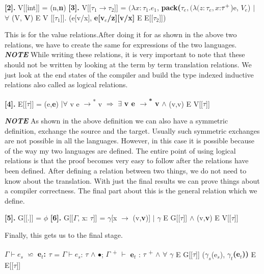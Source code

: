 \documentclass[10pt]{article}
\begin{document}
 \textbf{[2]. }V[[int]] = {(n,\textbf{n})}
 \vskip 0.1in
 \textbf{[3]. }V[[$\tau_1 \rightarrow \tau_2$]] = { $(\lambda x: \tau_1. e_1$, \textbf{pack($\tau_e, (\lambda(z:\tau_e,x$}:$\tau \textsuperscript{+}$)e, $V_e$) } $\lvert$ $\forall$ (V, \textbf{V})
E V [[$\tau_1$]]. (e[v/x], \textbf{e[v$_e$/z][v/x]} E E[[$\tau_2$]])
 
  
  \vskip 0.1in
  This is for the value relations.After doing it for as shown in the above two relations, we have to create the same for expressions of the two languages.  
  \vskip 0.2in
  \textbf{\textit{NOTE}} While writing these relations, it is very important to note that these should not be written by looking at the term by term translation relations. We just look at the end states of the compiler and build the type indexed inductive relations also called as logical relations. 
  
  \vskip 0.2in
  
  \textbf{[4]. }E[[$\tau$]] = {(e,\textbf{e})} $\lvert$$\forall$ v e $\rightarrow$\textsuperscript{*} v $\Longrightarrow$ $\exists$ \textbf{v e $\rightarrow$\textsuperscript{*} v } $\wedge$ (v,v) E V[[$\tau$]]
  
  \vskip 0.2in
   \textbf{\textit{NOTE}} As shown in the above definition we can also have a symmetric definition, exchange the source and the target. Usually such symmetric exchanges are not possible in all the languages. However, in this case it is possible because of the way my two languages are defined. 
  \vskip 0.2in
  The entire point of using logical relations is that the proof becomes very easy to follow after the relations have been defined. After defining a relation between two things, we do not need to know about the translation. With just the final results we can prove things about a compiler correctness.
  \vskip 0.1in
  The final part about this is the general relation which we define.
  
  \vskip 0.2in
  
  \textbf{[5]. }G[[.]] = {$\phi$}
  \vskip 0.1in
   \textbf{[6]. }G[[$\Gamma$, x: $\tau$]] = {$\gamma$[x $\rightarrow$ (v,\textbf{v})] $\lvert$ $\gamma$ E G[[$\tau$]] $\wedge$ (v,\textbf{v}) E V[[$\tau$]] }
  
 \vskip 0.2in
 
 Finally, this gets us to the final stage. 
 \vskip 0.2in
 
 
 $\Gamma \vdash e_s$ $\backsimeq$ \textbf{e$_t$: $\tau$} = 
 \vskip 0.1in
  $\Gamma \vdash e_s$: $\tau$ $\wedge$ $\bullet$; $\Gamma$ \textsuperscript{+} $\vdash$ \textbf{e}$_t$ : $\tau$ \textsuperscript{+} $\wedge$ $\forall$ $\gamma$ E G[[$\tau$]] ($\gamma_s$(e$_s$), \textbf{$\gamma_t$(e$_t$))} E E[[$\tau$]]
 
\end{document}
